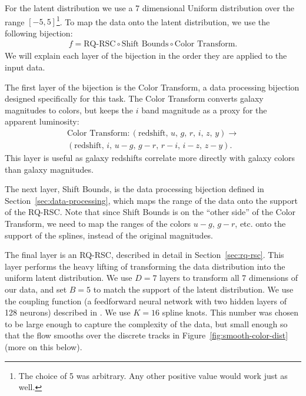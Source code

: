 \documentclass[twocolumn,twocolappendix]{aastex631}
\begin{document}
For the latent distribution we use a 7 dimensional Uniform distribution over the range $[-5, 5]$\footnote{The choice of 5 was arbitrary. Any other positive value would work just as well.}.
To map the data onto the latent distribution, we use the following bijection:
\begin{align}
    f = \text{RQ-RSC} \circ \text{Shift Bounds} \circ \text{Color Transform}.
\end{align}
We will explain each layer of the bijection in the order they are applied to the input data.

The first layer of the bijection is the Color Transform, a data processing bijection designed specifically for this task.
The Color Transform converts galaxy magnitudes to colors, but keeps the $i$ band magnitude as a proxy for the apparent luminosity:
\begin{multline}
    \text{Color Transform} : (\text{redshift},\, u,\, g,\, r,\, i,\, z,\, y) \to \\
    (\text{redshift},\, i,\, u-g,\, g-r,\, r-i,\, i-z,\, z-y).
\end{multline}
This layer is useful as galaxy redshifts correlate more directly with galaxy colors than galaxy magnitudes.

The next layer, Shift Bounds, is the data processing bijection defined in Section~\ref{sec:data-processing}, which maps the range of the data onto the support of the RQ-RSC.
Note that since Shift Bounds is on the ``other side'' of the Color Transform, we need to map the ranges of the colors $u-g$, $g-r$, etc. onto the support of the splines, instead of the original magnitudes.

The final layer is an RQ-RSC, described in detail in Section~\ref{sec:rq-rsc}.
This layer performs the heavy lifting of transforming the data distribution into the uniform latent distribution.
We use $D=7$ layers to transform all 7 dimensions of our data, and set $B=5$ to match the support of the latent distribution.
We use the coupling function (a feedforward neural network with two hidden layers of 128 neurons) described in \citet{durkan2019}.
We use $K=16$ spline knots.
This number was chosen to be large enough to capture the complexity of the data, but small enough so that the flow smooths over the discrete tracks in Figure~\ref{fig:smooth-color-dist} (more on this below).
\end{document}
